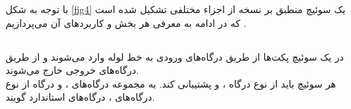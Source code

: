 با توجه به شکل \ref{fig4} یک سوئیچ  منطبق بر نسخه  از اجزاء مختلفی تشکیل شده است که در ادامه به معرفی هر بخش و کاربرد‌های آن می‌پردازیم \cite{spec}.

\subsection{}
در یک سوئیچ  پکت‌ها از طریق درگاه‌های ورودی به خط لوله وارد می‌شوند و از طریق درگاه‌های خروجی خارج می‌شوند.\\
هر سوئیچ  باید از نوع درگاه ،  و  پشتیبانی کند. به مجموعه درگاه‌های ،  و درگاه  از نوع درگاه‌های ، درگاه‌های استاندارد گویند.

